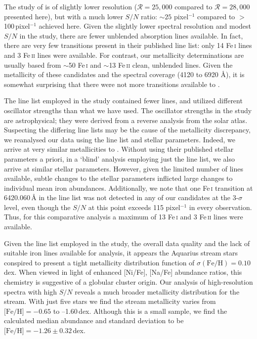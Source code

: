 \documentclass{emulateapj}
\begin{document}
The study of \citet{wylie-de-boer;et-al_2012} is of slightly lower resolution ($\mathcal{R} = 25,000$ compared to $\mathcal{R} = 28,000$ presented here), but with a much lower $S/N$ ratio: $\sim{}25$ pixel$^{-1}$ compared to $>$100\,pixel$^{-1}$ achieved here. Given the slightly lower spectral resolution and modest $S/N$ in the \citet{wylie-de-boer;et-al_2012} study, there are fewer unblended absorption lines available. In fact, there are very few transitions present in their published line list: only 14 Fe\,\textsc{i} lines and 3 Fe\,\textsc{ii} lines were available. For contrast, our metallicity determinations are usually based from ${\sim}$50 Fe\,\textsc{i} and ${\sim}$13 Fe\,\textsc{ii} clean, unblended lines. Given the metallicity of these candidates and the spectral coverage (4120 to 6920 {\AA}), it is somewhat surprising that there were not more transitions available to \citet{wylie-de-boer;et-al_2012}. 


The line list employed in the \citet{wylie-de-boer;et-al_2012} study contained fewer lines, and utilized different oscillator strengths than what we have used. The oscillator strengths in the \citet{wylie-de-boer;et-al_2012} study are astrophysical; they were derived from a reverse analysis from the \citet{hinkle;et-al_2003} solar atlas. Suspecting the differing line lists may be the cause of the metallicity discrepancy, we reanalysed our data using the \citet{wylie-de-boer;et-al_2012} line list and stellar parameters. Indeed, we arrive at very similar metallicities to \citet{wylie-de-boer;et-al_2012}. Without using their published stellar parameters a priori, in a `blind' analysis employing just the \citet{wylie-de-boer;et-al_2012} line list, we also arrive at similar stellar parameters. However, given the limited number of lines available, subtle changes to the stellar parameters inflicted large changes to individual mean iron abundances.  Additionally, we note that one Fe\,\textsc{i} transition at 6420.060\,\AA{} in the \citet{wylie-de-boer;et-al_2012} line list was not detected in any of our candidates at the 3-$\sigma$ level, even though the $S/N$ at this point exceeds 115 pixel$^{-1}$ in every observation. Thus, for this comparative analysis a maximum of 13 Fe\,\textsc{i} and 3 Fe\,\textsc{ii} lines were available.

Given the line list employed in the \citet{wylie-de-boer;et-al_2012} study, the overall data quality and the lack of suitable iron lines available for analysis, it appears the Aquarius stream stars conspired to present a tight metallicity distribution function of $\sigma(\mbox{Fe/H}) = 0.10$\,dex. When viewed in light of enhanced [Ni/Fe], [Na/Fe] abundance ratios, this chemistry is suggestive of a globular cluster origin. Our analysis of high-resolution spectra with high $S/N$ reveals a much broader metallicity distribution for the stream. With just five stars we find the stream metallicity varies from $\mbox{[Fe/H]} = -0.65$ to --1.60\,dex. Although this is a small sample, we find the calculated median abundance and standard deviation to be $\mbox{[Fe/H]} = -1.26 \pm 0.32$\,dex.
\end{document}
